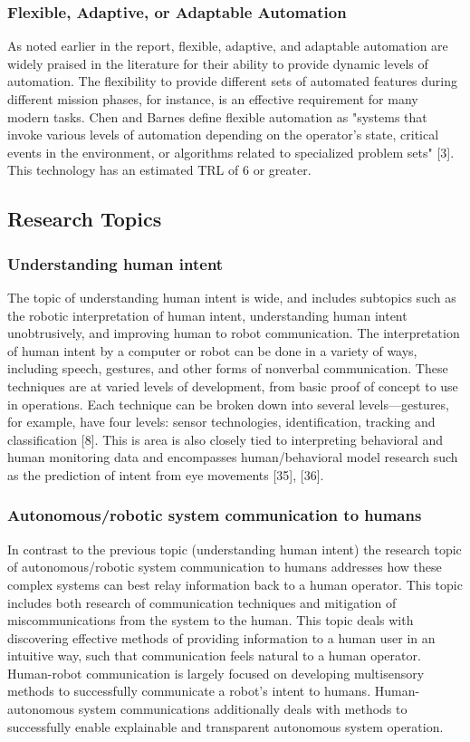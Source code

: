 \subsubsection{Flexible, Adaptive, or Adaptable Automation}
As noted earlier in the report, flexible, adaptive, and adaptable automation are widely praised in the literature for their ability to provide dynamic levels of automation. The flexibility to provide different sets of automated features during different mission phases, for instance, is an effective requirement for many modern tasks. Chen and Barnes define flexible automation as "systems that invoke various levels of automation depending on the operator’s state, critical events in the environment, or algorithms related to specialized problem sets" [3]. This technology has an estimated TRL of 6 or greater.

\subsection{Research Topics}
\subsubsection{Understanding human intent}
The topic of understanding human intent is wide, and includes subtopics such as the robotic interpretation of human intent, understanding human intent unobtrusively, and improving human to robot communication. The interpretation of human intent by a computer or robot can be done in a variety of ways, including speech, gestures, and other forms of nonverbal communication. These techniques are at varied levels of development, from basic proof of concept to use in operations. Each technique can be broken down into several levels—gestures, for example, have four levels: sensor technologies, identification, tracking and classification [8]. This is area is also closely tied to interpreting behavioral and human monitoring data and encompasses human/behavioral model research such as the prediction of intent from eye movements [35], [36].

\subsubsection{Autonomous/robotic system communication to humans}
In contrast to the previous topic (understanding human intent) the research topic of autonomous/robotic system communication to humans addresses how these complex systems can best relay information back to a human operator. This topic includes both research of communication techniques and mitigation of miscommunications from the system to the human. This topic deals with discovering effective methods of providing information to a human user in an intuitive way, such that communication feels natural to a human operator. Human-robot communication is largely focused on developing multisensory methods to successfully communicate a robot’s intent to humans. Human-autonomous system communications additionally deals with methods to successfully enable explainable and transparent autonomous system operation.

